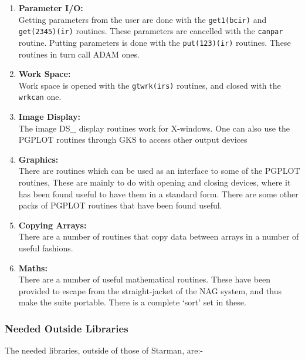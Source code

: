 \begin{enumerate}
\item {\bf Parameter I/O: \\ }
       Getting parameters from the user are done with the
      \verb|get1(bcir)|  and \verb|get(2345)(ir)| routines. These
      parameters are cancelled with the \verb|canpar| routine. Putting
      parameters is done with the \verb|put(123)(ir)| routines. These
      routines in turn call ADAM ones.

\item {\bf Work Space: \\ }
      Work space is opened with the \verb|gtwrk(irs)| routines, and
      closed with the \verb|wrkcan| one.

\item {\bf Image Display: \\ }
     The image DS\_ display routines work for X-windows.  One can also
     use the PGPLOT routines through GKS to access other output devices

\item {\bf Graphics: \\ }
      There are routines which can be used as an interface to some of
      the PGPLOT routines, These are mainly to do with opening and
      closing devices, where it has been found useful to have them in a
      standard form. There are some other packs of PGPLOT routines that
      have been found useful.

\item {\bf Copying Arrays: \\}
      There are a number of routines that copy data between arrays in a
      number of useful fashions.

\item {\bf Maths: \\}
      There are a number of useful mathematical routines. These have
      been provided to escape from the straight-jacket of the NAG
      system, and thus make the suite portable. There is a complete
      `sort' set in these.

\end{enumerate}

\subsubsection{Needed Outside Libraries}

The needed libraries, outside of those of Starman, are:-

